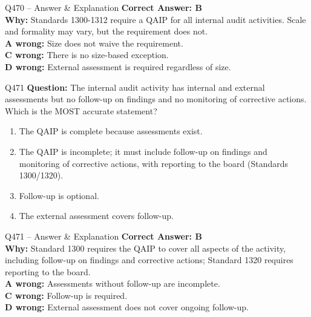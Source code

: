 \documentclass[aspectratio=169,10pt]{beamer}
\begin{document}
	\begin{frame}[t]{Q470 -- Answer \& Explanation}
		\small
		\textbf{Correct Answer: B} \\[4pt]
		\textbf{Why:} Standards 1300-1312 require a QAIP for all internal audit activities. Scale and formality may vary, but the requirement does not. \\[4pt]
		\textbf{A wrong:} Size does not waive the requirement. \\[2pt]
		\textbf{C wrong:} There is no size-based exception. \\[2pt]
		\textbf{D wrong:} External assessment is required regardless of size.
	\end{frame}
	
	\begin{frame}[t]{Q471}
		\small
		\textbf{Question:} The internal audit activity has internal and external assessments but no follow-up on findings and no monitoring of corrective actions. Which is the MOST accurate statement?
		\begin{enumerate}[label=\Alph*.,itemsep=1pt,topsep=2pt]
			\item The QAIP is complete because assessments exist.
			\item The QAIP is incomplete; it must include follow-up on findings and monitoring of corrective actions, with reporting to the board (Standards 1300/1320).
			\item Follow-up is optional.
			\item The external assessment covers follow-up.
		\end{enumerate}
	\end{frame}
	
	\begin{frame}[t]{Q471 -- Answer \& Explanation}
		\small
		\textbf{Correct Answer: B} \\[4pt]
		\textbf{Why:} Standard 1300 requires the QAIP to cover all aspects of the activity, including follow-up on findings and corrective actions; Standard 1320 requires reporting to the board. \\[4pt]
		\textbf{A wrong:} Assessments without follow-up are incomplete. \\[2pt]
		\textbf{C wrong:} Follow-up is required. \\[2pt]
		\textbf{D wrong:} External assessment does not cover ongoing follow-up.
	\end{frame}
	
\end{document}
